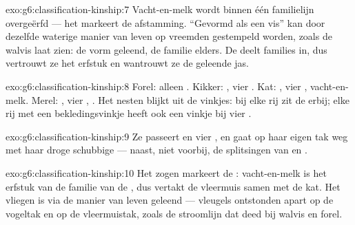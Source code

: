 \begin{solution}{exo:g6:classification-kinship:7}
Vacht-en-melk wordt binnen één familielijn overgeërfd --- het markeert de
afstamming. ``Gevormd als een vis'' kan door dezelfde waterige manier van
leven op vreemden gestempeld worden, zoals de walvis laat zien: de vorm
geleend, de familie elders. De  deelt families in, dus
vertrouwt ze het erfstuk en wantrouwt ze de geleende jas.
\end{solution}

\begin{solution}{exo:g6:classification-kinship:8}
Forel: alleen . Kikker: , vier . Kat:
, vier , vacht-en-melk. Merel: , vier
, . Het nesten blijkt uit de vinkjes: bij elke rij zit de
 erbij; elke rij met een bekledingsvinkje heeft ook een vinkje
bij vier .
\end{solution}

\begin{solution}{exo:g6:classification-kinship:9}
Ze passeert  en vier , en gaat op haar eigen tak weg
met haar droge schubbige  --- naast, niet voorbij, de splitsingen van
 en .
\end{solution}

\begin{solution}{exo:g6:classification-kinship:10}
Het zogen markeert de : vacht-en-melk is het erfstuk van de
familie van de , dus vertakt de vleermuis samen met de kat. Het
vliegen is via de manier van leven geleend --- vleugels ontstonden apart
op de vogeltak en op de vleermuistak, zoals de stroomlijn dat deed bij
walvis en forel.
\end{solution}

